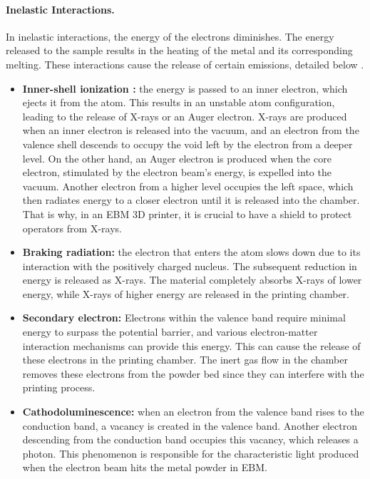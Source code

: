 \paragraph{Inelastic Interactions.} In inelastic interactions, the energy of the electrons diminishes. The energy released to the sample results in the heating of the metal and its corresponding melting. These interactions cause the release of certain emissions, detailed below \cite{krumeich_properties_2015, goldstein_scanning_2018}.
\begin{itemize}
    \item \textbf{Inner-shell ionization :} the energy is passed to an inner electron, which ejects it from the atom. This results in an unstable atom configuration, leading to the release of X-rays or an Auger electron. X-rays are produced when an inner electron is released into the vacuum, and an electron from the valence shell descends to occupy the void left by the electron from a deeper level. On the other hand, an Auger electron is produced when the core electron, stimulated by the electron beam's energy, is expelled into the vacuum. Another electron from a higher level occupies the left space, which then radiates energy to a closer electron until it is released into the chamber. That is why, in an EBM 3D printer, it is crucial to have a shield to protect operators from X-rays.
    \item \textbf{Braking radiation:} the electron that enters the atom slows down due to its interaction with the positively charged nucleus. The subsequent reduction in energy is released as X-rays. The material completely absorbs X-rays of lower energy, while X-rays of higher energy are released in the printing chamber.
    \item \textbf{Secondary electron:} Electrons within the valence band require minimal energy to surpass the potential barrier, and various electron-matter interaction mechanisms can provide this energy. This can cause the release of these electrons in the printing chamber. The inert gas flow in the chamber removes these electrons from the powder bed since they can interfere with the printing process.
    \item \textbf{Cathodoluminescence:} when an electron from the valence band rises to the conduction band, a vacancy is created in the valence band. Another electron descending from the conduction band occupies this vacancy, which releases a photon. This phenomenon is responsible for the characteristic light produced when the electron beam hits the metal powder in EBM. 

\end{itemize}
